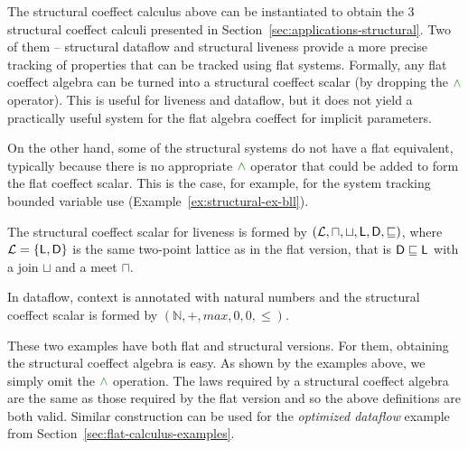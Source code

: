 The structural coeffect calculus above can be instantiated to obtain the 3 structural coeffect calculi
presented in Section~\ref{sec:applications-structural}. Two of them -- structural dataflow and
structural liveness provide a more precise tracking of properties that can be tracked using
flat systems. Formally, any flat coeffect algebra can be turned into a structural coeffect scalar
(by dropping the $\czip$ operator). This is useful for liveness and dataflow, but it does not yield
a practically useful system for the flat algebra coeffect for implicit parameters.

On the other hand, some of the structural systems do not have a flat equivalent, typically
because there is no appropriate $\czip$ operator that could be added to form the flat coeffect
scalar. This is the case, for example, for the system tracking bounded variable use
(Example~\ref{ex:structural-ex-bll}).

\begin{example}
The structural coeffect scalar for liveness is formed by
$(\mathcal{L}, \sqcap, \sqcup, \textnormal{\sffamily L}, \textnormal{\sffamily D}, \sqsubseteq)$, where $\mathcal{L}=\{ \ident{L}, \ident{D} \}$ is
the same two-point lattice as in the flat version, that is $\textnormal{\sffamily D} \sqsubseteq \textnormal{\sffamily L}$
with a join $\sqcup$ and a meet $\sqcap$.
\end{example}

\begin{example}
In dataflow, context is annotated with natural numbers and the structural coeffect scalar is formed
by $(\mathbb{N}, +, \mathit{max}, 0, 0, \leq)$.
\end{example}

\noindent
These two examples have both flat and structural versions. For them, obtaining the structural
coeffect algebra is easy. As shown by the examples above, we simply omit the $\czip$ operation. The
laws required by a structural coeffect algebra are the same as those required by the flat version
and so the above definitions are both valid. Similar construction can be used for the
\emph{optimized dataflow} example from Section~\ref{sec:flat-calculus-examples}.

